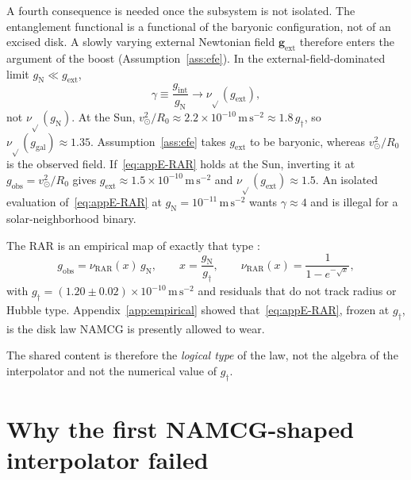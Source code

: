 A fourth consequence is needed once the subsystem is not isolated.
The entanglement functional is a functional of the baryonic
configuration, not of an excised disk. A slowly varying external
Newtonian field \(\mathbf{g}_{\mathrm{ext}}\) therefore enters the
argument of the boost (Assumption~\ref{ass:efe}). In the
external-field-dominated limit \(g_{\mathrm{N}}\ll g_{\mathrm{ext}}\),
\begin{equation}
  \label{eq:appE-efe}
  \gamma
  \equiv\frac{g_{\mathrm{int}}}{g_{\mathrm{N}}}
  \to\nu_{\sqrt{}}(g_{\mathrm{ext}}),
\end{equation}
not \(\nu_{\sqrt{}}(g_{\mathrm{N}})\).
At the Sun, \(v_{\odot}^{2}/R_{0}\approx 2.2\times 10^{-10}\,\mathrm{m\,s^{-2}}
\approx 1.8\,g_{\dagger}\), so \(\nu_{\sqrt{}}(g_{\mathrm{gal}})\approx 1.35\).
Assumption~\ref{ass:efe} takes \(g_{\mathrm{ext}}\) to be baryonic,
whereas \(v_{\odot}^{2}/R_{0}\) is the observed field. If~\eqref{eq:appE-RAR}
holds at the Sun, inverting it at \(g_{\mathrm{obs}}=v_{\odot}^{2}/R_{0}\) gives
\(g_{\mathrm{ext}}\approx 1.5\times 10^{-10}\,\mathrm{m\,s^{-2}}\) and
\(\nu_{\sqrt{}}(g_{\mathrm{ext}})\approx 1.5\).
An isolated evaluation of~\eqref{eq:appE-RAR} at
\(g_{\mathrm{N}}=10^{-11}\,\mathrm{m\,s^{-2}}\) wants \(\gamma\approx 4\)
and is illegal for a solar-neighborhood binary.

The RAR is an empirical map of exactly that type
\cite{McGaugh2016,Lelli2017RAR}:
\begin{equation}
  \label{eq:appE-RAR}
  g_{\mathrm{obs}}
  =\nu_{\mathrm{RAR}}(x)\,g_{\mathrm{N}},
  \qquad
  x=\frac{g_{\mathrm{N}}}{g_\dagger},
  \qquad
  \nu_{\mathrm{RAR}}(x)
  =\frac{1}{1-e^{-\sqrt{x}}},
\end{equation}
with \(g_\dagger=(1.20\pm 0.02)\times 10^{-10}\,\mathrm{m\,s^{-2}}\)
and residuals that do not track radius or Hubble type. Appendix~\ref{app:empirical}
showed that~\eqref{eq:appE-RAR}, frozen at \(g_\dagger\), is the
disk law NAMCG is presently allowed to wear.

The shared content is therefore the \emph{logical type} of the
law, not the algebra of the interpolator and not the numerical
value of \(g_\dagger\).

\section{Why the first NAMCG-shaped interpolator failed}
\label{sec:appE-failed}

